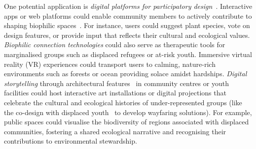 One potential application is \emph{digital platforms for participatory design}~\cite{arts2015digital}. Interactive apps or web platforms could enable community members to actively contribute to shaping biophilic spaces~\cite{arts2015digital, greene2020mobiles}. For instance, users could suggest plant species, vote on design features, or provide input that reflects their cultural and ecological values. \emph{Biophilic connection technologies} could also serve as therapeutic tools for marginalised groups such as displaced refugees or at-risk youth. Immersive virtual reality (VR) experiences could transport users to calming, nature-rich environments such as forests or ocean providing solace amidst hardships. \emph{Digital storytelling} through architectural features~\cite{burova2019promoting} in community centres or youth facilities could host interactive art installations or digital projections that celebrate the cultural and ecological histories of under-represented groups (like the co-design with displaced youth~\cite{fisher2016future} to develop wayfaring solutions). For example, public spaces could visualise the biodiversity of regions associated with displaced communities, fostering a shared ecological narrative and recognising their contributions to environmental stewardship.

\begingroup
\fontsize{7.4}{8.8}\selectfont
\setlength{\tabcolsep}{2.4pt}
\renewcommand{\arraystretch}{1.04}
\setlength{\LTleft}{0pt}
\setlength{\LTright}{0pt}

